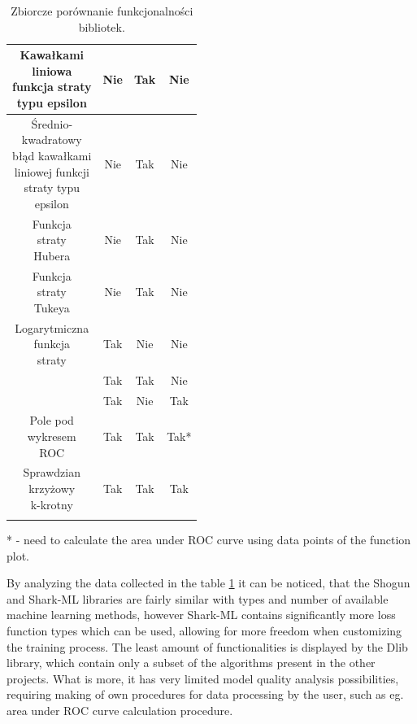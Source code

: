 \begin{longtable}{c | c | c | c}
	\hline
	\makecell{Kawałkami \\ liniowa \\ funkcja straty \\ typu epsilon} & Nie & Tak & Nie\\
	\hline
	\makecell{Średnio-\\kwadratowy \\ błąd kawałkami \\ liniowej funkcji \\ straty typu \\ epsilon} & Nie & Tak & Nie\\
	\hline
	\makecell{Funkcja \\ straty \\ Hubera} & Nie & Tak & Nie\\
	\hline
	\makecell{Funkcja \\ straty \\ Tukeya} & Nie & Tak & Nie\\
	\hline
	\makecell{Logarytmiczna \\ funkcja \\ straty} & Tak & Nie & Nie\\
	\hline
	\makecell{Metryka $R^2$} & Tak & Tak & Nie\\
	\hline
	\makecell{Dokładność} & Tak & Nie & Tak \\
	\hline
	\makecell{Pole pod \\ wykresem \\ ROC} & Tak & Tak & Tak* \\
	\hline
	\makecell{Sprawdzian \\ krzyżowy \\ k-krotny} & Tak & Tak & Tak \\
	\caption{Zbiorcze porównanie funkcjonalności bibliotek.}
	\label{fun:sum}
\end{longtable} 

* - need to calculate the area under ROC curve using data points of the function plot.

By analyzing the data collected in the table \ref{fun:sum} it can be noticed, that the Shogun and Shark-ML libraries are fairly similar with types and number of available machine learning methods, however Shark-ML contains significantly more loss function types which can be used, allowing for more freedom when customizing the training process. The least amount of functionalities is displayed by the Dlib library, which contain only a subset of the algorithms present in the other projects. What is more, it has very limited model quality analysis possibilities, requiring making of own procedures for data processing by the user, such as eg. area under ROC curve calculation procedure.

